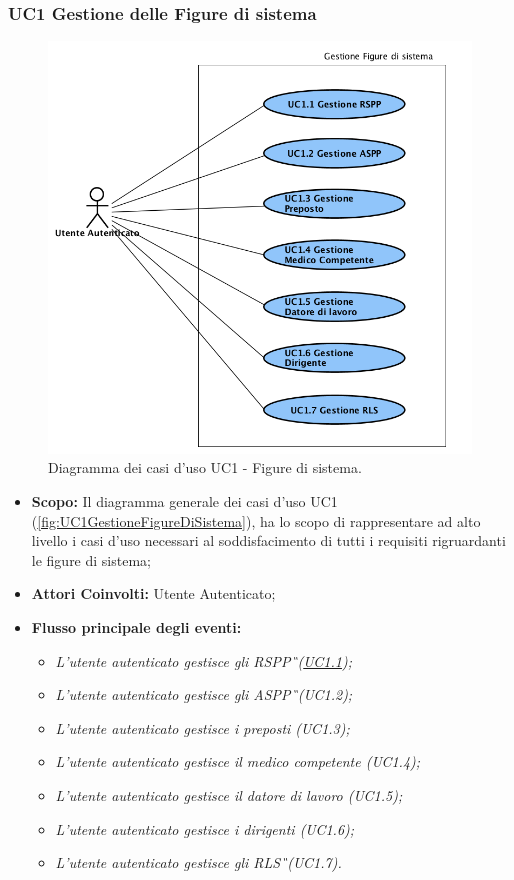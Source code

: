 	\subsubsection{UC1 Gestione delle Figure di sistema}
	\label{section:UC1}
	\begin{figure}[H]
		\begin{center}
			\includegraphics[width=12cm]{Pics/UC1GestioneFigureDiSistema.png}
			\caption{
				Diagramma dei casi d'uso UC1 - Figure di sistema.}
			\label{fig:UC1GestioneFigureDiSistema}
		\end{center}
	\end{figure}
	\begin{itemize}
		\item \textbf{Scopo:} Il diagramma generale dei casi d'uso UC1 (\autoref{fig:UC1GestioneFigureDiSistema}), ha lo scopo di rappresentare ad alto livello i casi d'uso necessari al soddisfacimento di tutti i requisiti rigruardanti le figure di sistema;
		\item \textbf{Attori Coinvolti:} Utente Autenticato;
		\item \textbf{Flusso principale degli eventi:} 
		\begin{itemize}
			\item \textit{L'utente autenticato gestisce gli \gls{RSPP}\G\ (\hyperref[section:UC1_1]{UC1.1});}
			\item \textit{L'utente autenticato gestisce gli \gls{ASPP}\G\ (UC1.2);}
			\item \textit{L'utente autenticato gestisce i preposti (UC1.3);}
			\item \textit{L'utente autenticato gestisce il medico competente (UC1.4);}
			\item \textit{L'utente autenticato gestisce il datore di lavoro (UC1.5);}
			\item \textit{L'utente autenticato gestisce i dirigenti (UC1.6);}
			\item \textit{L'utente autenticato gestisce gli \gls{RLS}\G\  (UC1.7).}
		\end{itemize}
	\end{itemize}
	
